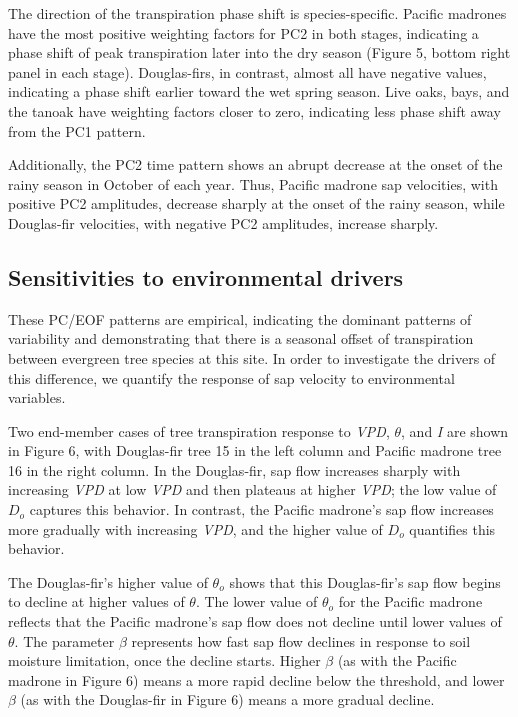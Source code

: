 The direction of the transpiration phase shift is species-specific.  Pacific madrones have the most positive weighting factors for PC2 in both stages, indicating a phase shift of peak transpiration later into the dry season (Figure 5, bottom right panel in each stage).  Douglas-firs, in contrast, almost all have negative values, indicating a phase shift earlier toward the wet spring season.  Live oaks, bays, and the tanoak have weighting factors closer to zero, indicating less phase shift away from the PC1 pattern.

Additionally, the PC2 time pattern shows an abrupt decrease at the onset of the rainy season in October of each year.  Thus, Pacific madrone sap velocities, with positive PC2 amplitudes, decrease sharply at the onset of the rainy season, while Douglas-fir velocities, with negative PC2 amplitudes, increase sharply.

\subsection{Sensitivities to environmental drivers}
These PC/EOF patterns are empirical, indicating the dominant patterns of variability and demonstrating that there is a seasonal offset of transpiration between evergreen tree species at this site.  In order to investigate the drivers of this difference, we quantify the response of sap velocity to environmental variables.

Two end-member cases of tree transpiration response to \textit{VPD}, $\theta$, and \textit{I} are shown in Figure 6, with Douglas-fir tree 15 in the left column and Pacific madrone tree 16 in the right column.  In the Douglas-fir, sap flow increases sharply with increasing \textit{VPD} at low \textit{VPD} and then plateaus at higher \textit{VPD}; the low value of $D_o$ captures this behavior.  In contrast, the Pacific madrone's sap flow increases more gradually with increasing \textit{VPD}, and the higher value of $D_o$ quantifies this behavior.

The Douglas-fir's higher value of $\theta_o$ shows that this Douglas-fir's sap flow begins to decline at higher values of $\theta$.  The lower value of $\theta_o$ for the Pacific madrone reflects that the Pacific madrone's sap flow does not decline until lower values of $\theta$.  The parameter $\beta$ represents how fast sap flow declines in response to soil moisture limitation, once the decline starts.  Higher $\beta$ (as with the Pacific madrone in Figure 6) means a more rapid decline below the threshold, and lower $\beta$ (as with the Douglas-fir in Figure 6) means a more gradual decline.

